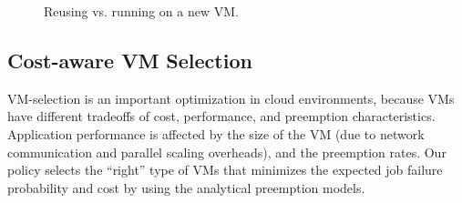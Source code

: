 \documentclass[compsoc]{IEEEtran}
\begin{document}
\begin{figure}[t]
  \hfill
  \label{fig:transition-all}
  \caption{Reusing vs. running on a new VM.}
\end{figure}






\subsection{Cost-aware VM Selection}
\label{subsec:vm-selection}

VM-selection is an important optimization in cloud environments, because VMs have different tradeoffs of cost, performance, and preemption characteristics. 
Application performance is affected by the size of the VM (due to network communication and parallel scaling overheads), and the preemption rates. 
Our policy selects the ``right'' type of  VMs that minimizes the expected job failure probability and cost by using the analytical preemption models. 
\end{document}
